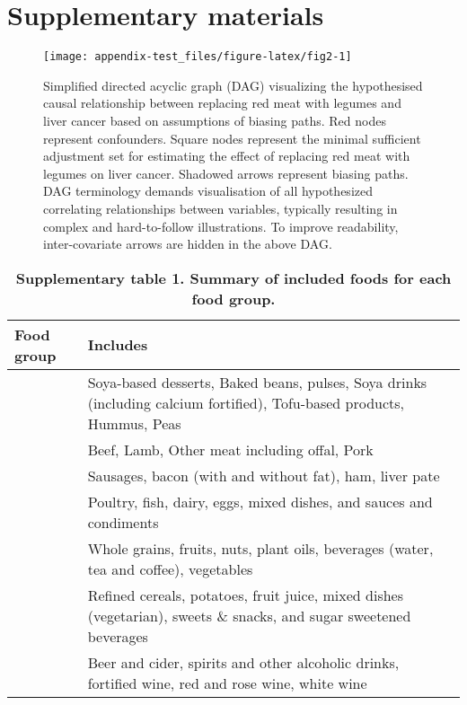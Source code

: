 \documentclass[nutrients,article,submit,moreauthors,pdftex]{Definitions/mdpi}
\begin{document}

\clearpage

\hypertarget{sec1}{%
\section{Supplementary materials}\label{sec1}}

\begin{figure*}[h]

{\centering \texttt{[image: appendix-test\_files/figure-latex/fig2-1]}

}

\caption{Simplified directed acyclic graph (DAG) visualizing the hypothesised causal relationship between replacing red meat with legumes and liver cancer based on assumptions of biasing paths. Red nodes represent confounders. Square nodes represent the minimal sufficient adjustment set for estimating the effect of replacing red meat with legumes on liver cancer. Shadowed arrows represent biasing paths. DAG terminology demands visualisation of all hypothesized correlating relationships between variables, typically resulting in complex and hard-to-follow illustrations. To improve readability, inter-covariate arrows are hidden in the above DAG.}\label{fig:fig2}
\end{figure*}

\begin{table}[t]
\caption{\label{tab:food-group}\textbf{Supplementary table 1. Summary of included foods for each food group.}}
\fontsize{9.0pt}{10.8pt}\selectfont
\begin{tabular*}{1\linewidth}{@{\extracolsep{\fill}}>{\raggedright\arraybackslash}p{}>{\raggedright\arraybackslash}p{}}
\toprule
\textbf{Food group} & \textbf{Includes} \\
\midrule\addlinespace[2.5pt]
{\bfseries Legumes} & Soya-based desserts, Baked beans, pulses, Soya drinks (including calcium fortified),
  Tofu-based products, Hummus, Peas \\
{\bfseries Red meat} & Beef, Lamb, Other meat including offal, Pork \\
{\bfseries Processed meat} & Sausages, bacon (with and without fat), ham, liver pate \\
{\bfseries Animal-based foods} & Poultry, fish, dairy, eggs, mixed dishes, and sauces and condiments \\
{\bfseries Healthy plant-based foods} & Whole grains, fruits, nuts, plant oils, beverages (water, tea and coffee), vegetables \\
{\bfseries Unhealthy plant-based foods} & Refined cereals, potatoes, fruit juice, mixed dishes (vegetarian), sweets \& snacks, and sugar sweetened beverages \\
{\bfseries Alcoholic beverages} & Beer and cider, spirits and other alcoholic drinks, fortified wine, red and rose wine, white wine \\
\bottomrule
\end{tabular*}
\end{table}
\end{document}
